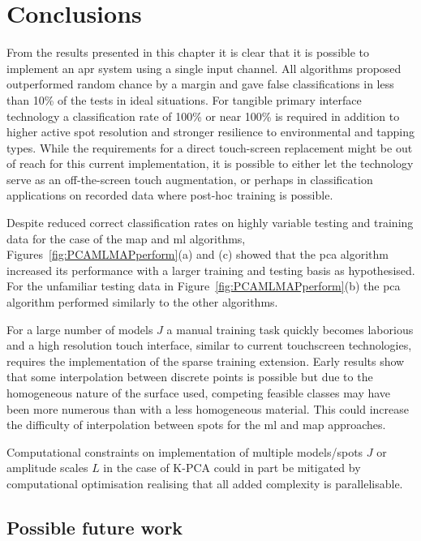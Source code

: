 \section{Conclusions}
From the results presented in this chapter it is clear that it is possible to implement an \gls{apr} system using a single input channel. All algorithms proposed outperformed random chance by a margin and gave false classifications in less than 10\% of the tests in ideal situations. For tangible primary interface technology a classification rate of 100\% or near 100\% is required in addition to higher active spot resolution and stronger resilience to environmental and tapping types. While the requirements for a direct touch-screen replacement might be out of reach for this current implementation, it is possible to either let the technology serve as an off-the-screen touch augmentation, or perhaps in classification applications on recorded data where post-hoc training is possible.

Despite reduced correct classification rates on highly variable testing and training data for the case of the \gls{map} and \gls{ml} algorithms, Figures~\ref{fig:PCAMLMAPperform}(a) and (c) showed that the \gls{pca} algorithm increased its performance with a larger training and testing basis as hypothesised. For the unfamiliar testing data in Figure~\ref{fig:PCAMLMAPperform}(b) the \gls{pca} algorithm performed similarly to the other algorithms.

For a large number of models $J$ a manual training task quickly becomes laborious and a high resolution touch interface, similar to current touchscreen technologies, requires the implementation of the sparse training extension. Early results show that some interpolation between discrete points is possible but due to the homogeneous nature of the surface used, competing feasible classes may have been more numerous than with a less homogeneous material. This could increase the difficulty of interpolation between spots for the \gls{ml} and \gls{map} approaches.

Computational constraints on implementation of multiple models/spots $J$ or amplitude scales $L$ in the case of K-PCA could in part be mitigated by computational optimisation realising that all added complexity is parallelisable.

\subsection{Possible future work}
